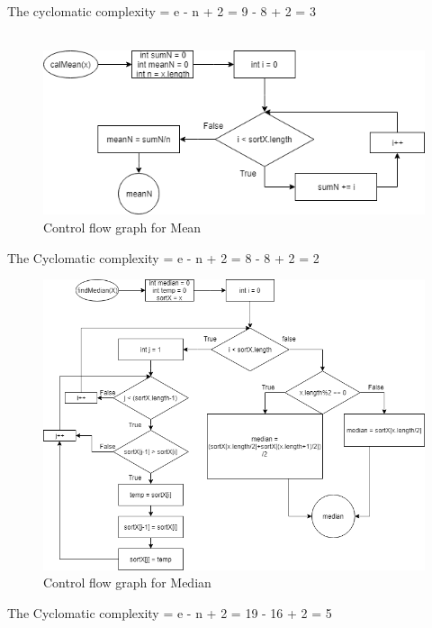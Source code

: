 \documentclass[a4paper, 11pt]{article}
\begin{document}
The cyclomatic complexity = e - n + 2 = 9 - 8 + 2 = 3\\ \\
\begin{figure}[H]
		\begin{center}
		\includegraphics[width=\columnwidth]{mean_controlFlow.png}
		\caption{Control flow graph for Mean}
		\label{fig:figure}
		\end{center}
	\end{figure}
The Cyclomatic complexity = e - n + 2 = 8 - 8 + 2 = 2\\
\begin{figure}[H]
		\begin{center}
		\includegraphics[width=\columnwidth]{median_controlFlow.png}
		\caption{Control flow graph for Median}
		\label{fig:figure}
		\end{center}
	\end{figure}
The Cyclomatic complexity  = e - n + 2 = 19 - 16 + 2 = 5\\
\end{document}
